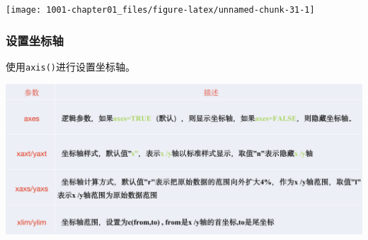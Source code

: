 \documentclass[
]{book}
\begin{document}
\begin{center}\texttt{[image: 1001-chapter01\_files/figure-latex/unnamed-chunk-31-1]} \end{center}

\hypertarget{ux8bbeux7f6eux5750ux6807ux8f74}{%
\subsubsection{设置坐标轴}\label{ux8bbeux7f6eux5750ux6807ux8f74}}

使用\texttt{axis()}进行设置坐标轴。

\includegraphics{figure/7.jpg}
\end{document}
